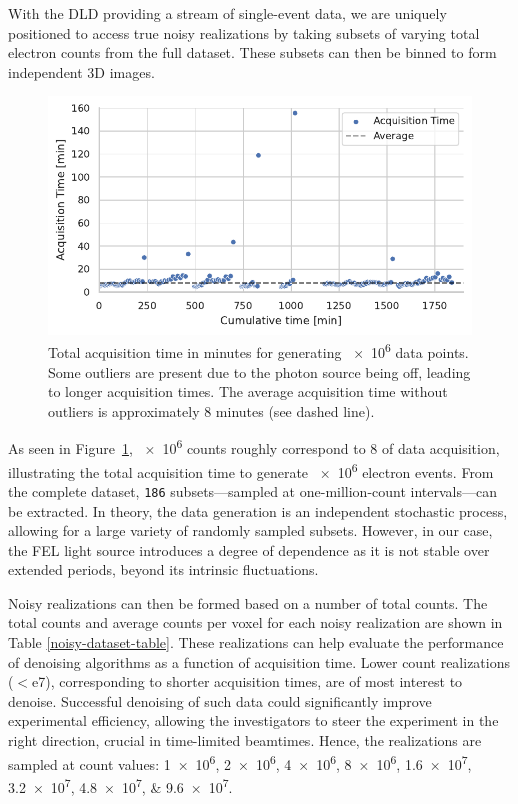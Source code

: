 With the \gls{DLD} providing a stream of single-event data, we are uniquely positioned to access true noisy realizations by taking subsets of varying total electron counts from the full dataset. These subsets can then be binned to form independent 3D images.

\begin{figure}
    \centering
    \includegraphics[width=0.8\linewidth]{images/acq_time_1M.pdf}
    \caption{Total acquisition time in minutes for generating \num{e6} data points. Some outliers are present due to the photon source being off, leading to longer acquisition times. The average acquisition time without outliers is approximately 8 minutes (see dashed line).}
    \label{fig:acq-time-1M}
\end{figure}


As seen in Figure~\ref{fig:acq-time-1M}, \num{e6} counts roughly correspond to \qty{8}{\min} of data acquisition, illustrating the total acquisition time to generate \num{e6} electron events. From the complete dataset, \texttt{186} subsets—sampled at one-million-count intervals—can be extracted. In theory, the data generation is an independent stochastic process, allowing for a large variety of randomly sampled subsets. However, in our case, the \gls{FEL} light source introduces a degree of dependence as it is not stable over extended periods, beyond its intrinsic fluctuations.

Noisy realizations can then be formed based on a number of total counts. The total counts and average counts per voxel for each noisy realization are shown in Table \ref{noisy-dataset-table}. These realizations can help evaluate the performance of denoising algorithms as a function of acquisition time. Lower count realizations ($<$e7), corresponding to shorter acquisition times, are of most interest to denoise. Successful denoising of such data could significantly improve experimental efficiency, allowing the investigators to steer the experiment in the right direction, crucial in time-limited \glspl{beamtime}. Hence, the realizations are sampled at count values: \numlist{1e6;2e6;4e6;8e6;1.6e7;3.2e7;4.8e7;9.6e7}.


